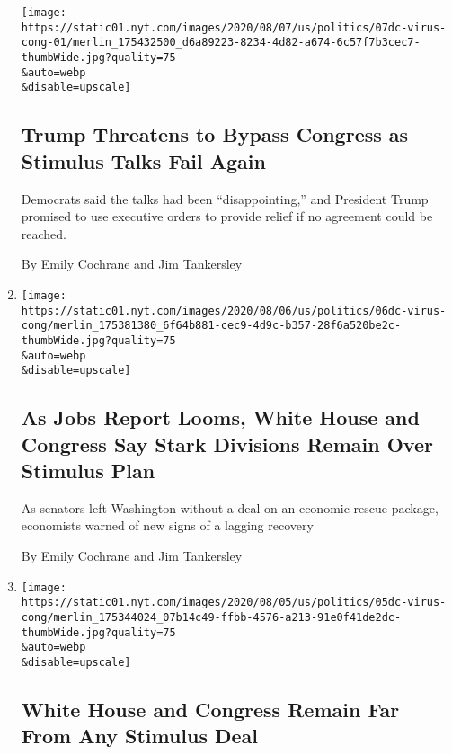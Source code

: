 \begin{enumerate}
  \texttt{[image: https://static01.nyt.com/images/2020/08/07/us/politics/07dc-virus-cong-01/merlin\_175432500\_d6a89223-8234-4d82-a674-6c57f7b3cec7-thumbWide.jpg?quality=75\\\&auto=webp\\\&disable=upscale]}

  \hypertarget{trump-threatens-to-bypass-congress-as-stimulus-talks-fail-again}{%
  \subsection{Trump Threatens to Bypass Congress as Stimulus Talks Fail
  Again}\label{trump-threatens-to-bypass-congress-as-stimulus-talks-fail-again}}

  Democrats said the talks had been ``disappointing,'' and President
  Trump promised to use executive orders to provide relief if no
  agreement could be reached.

  By Emily Cochrane and Jim Tankersley
\item
  \href{/2020/08/06/business/coronavirus-jobs-report-trump-congress-stimulus.html}{}

  \texttt{[image: https://static01.nyt.com/images/2020/08/06/us/politics/06dc-virus-cong/merlin\_175381380\_6f64b881-cec9-4d9c-b357-28f6a520be2c-thumbWide.jpg?quality=75\\\&auto=webp\\\&disable=upscale]}

  \hypertarget{as-jobs-report-looms-white-house-and-congress-say-stark-divisions-remain-over-stimulus-plan}{%
  \subsection{As Jobs Report Looms, White House and Congress Say Stark
  Divisions Remain Over Stimulus
  Plan}\label{as-jobs-report-looms-white-house-and-congress-say-stark-divisions-remain-over-stimulus-plan}}

  As senators left Washington without a deal on an economic rescue
  package, economists warned of new signs of a lagging recovery

  By Emily Cochrane and Jim Tankersley
\item
  \href{/2020/08/05/us/politics/congress-coronavirus-stimulus.html}{}

  \texttt{[image: https://static01.nyt.com/images/2020/08/05/us/politics/05dc-virus-cong/merlin\_175344024\_07b14c49-ffbb-4576-a213-91e0f41de2dc-thumbWide.jpg?quality=75\\\&auto=webp\\\&disable=upscale]}

  \hypertarget{white-house-and-congress-remain-far-from-any-stimulus-deal}{%
  \subsection{White House and Congress Remain Far From Any Stimulus
  Deal}\label{white-house-and-congress-remain-far-from-any-stimulus-deal}}


\end{enumerate}
